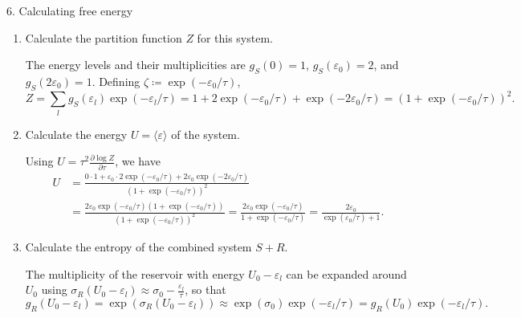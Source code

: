 \documentclass[11pt]{article}
\begin{document}
\begin{problem}{6. Calculating free energy}\hfill
  \begin{enumerate}[label=(\alph*)]
    \item Calculate the partition function \( Z \) for this system.
    \begin{answer}
      The energy levels and their multiplicities are \( g_S(0) = 1 \), \( g_S(\varepsilon_0) = 2 \), and \( g_S(2\varepsilon_0) = 1 \). Defining \( \zeta \coloneq \exp(-\varepsilon_0/\tau) \),
      \begin{equation}
      \label{eq:22}
        Z = \sum_{l} g_S(\varepsilon_l)\exp(-\varepsilon_l/\tau) = 1 + 2\exp(-\varepsilon_0/\tau) + \exp(-2\varepsilon_0/\tau) = \left( 1 + \exp(-\varepsilon_0/\tau) \right)^2.
      \end{equation}
    \end{answer}
    \item Calculate the energy \( U = \langle \varepsilon \rangle \) of the system.
    \begin{answer}
      Using \( U = \tau^2 \frac{\partial \log Z}{\partial \tau} \), we have
      \begin{equation}
      \label{eq:23}
      \begin{aligned}
        U &= \frac{0\cdot 1 + \varepsilon_0 \cdot 2\exp(-\varepsilon_0/\tau) + 2\varepsilon_0 \exp(-2\varepsilon_0/\tau)}{(1 + \exp(-\varepsilon_0/\tau))^2} \\[1.5ex]
        &= \frac{2\varepsilon_0\exp(-\varepsilon_0/\tau)\left(1 + \exp(-\varepsilon_0/\tau)\right)}{(1 + \exp(-\varepsilon_0/\tau))^2} = \frac{2\varepsilon_0\exp(-\varepsilon_0/\tau)}{1 + \exp(-\varepsilon_0/\tau)} = \frac{2\varepsilon_0}{\exp(\varepsilon_0/\tau) + 1}.
      \end{aligned}
      \end{equation}
    \end{answer}
    \item Calculate the entropy of the combined system \( S + R \).
    \begin{answer}
      The multiplicity of the reservoir with energy \( U_0 - \varepsilon_l \) can be expanded around \( U_0 \) using \( \sigma_R(U_0 - \varepsilon_l) \approx \sigma_0 - \frac{\varepsilon_l}{\tau} \), so that
      \begin{equation}
        g_R(U_0 - \varepsilon_l) = \exp(\sigma_R(U_0 - \varepsilon_l)) \approx \exp(\sigma_0)\exp(-\varepsilon_l/\tau) = g_R(U_0)\exp(-\varepsilon_l/\tau).
      \end{equation}

\end{answer}
\end{enumerate}
\end{problem}
\end{document}
